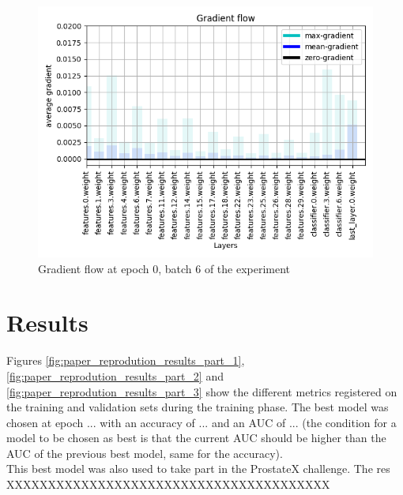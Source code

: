 \begin{figure}[!h]
\centering
\includegraphics[width=1\textwidth, keepaspectratio=true]{./figures/gradient_flow.png}
\caption{Gradient flow at epoch 0, batch 6 of the experiment}
\label{fig:gradient_flow}
\end{figure}
\section{Results}
Figures \ref{fig:paper_reprodution_results_part_1}, \ref{fig:paper_reprodution_results_part_2} and \ref{fig:paper_reprodution_results_part_3} show the different metrics registered on the training and validation sets during the training phase. The best model was chosen at epoch ... with an accuracy of ... and an AUC of ... (the condition for a model to be chosen as best is that the current AUC should be higher than the AUC of the previous best model, same for the accuracy).\\
This best model was also used to take part in the ProstateX challenge. The res XXXXXXXXXXXXXXXXXXXXXXXXXXXXXXXXXXXXXXX

